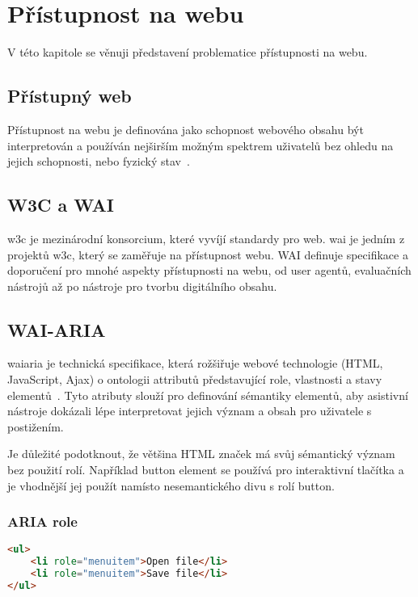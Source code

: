 \chapter{Přístupnost na webu}

V této kapitole se věnuji představení problematice přístupnosti na webu.

\section{Přístupný web}

Přístupnost na webu je definována jako schopnost webového obsahu být interpretován a používán nejširším možným spektrem uživatelů bez ohledu na jejich schopnosti, nebo fyzický stav~\cite{w3-accessibility}.

\section{W3C a WAI}


\gls{w3c} je mezinárodní konsorcium, které vyvíjí standardy pro web.
\gls{wai} je jedním z projektů \gls{w3c}, který se zaměřuje na přístupnost webu.
WAI definuje specifikace a doporučení pro mnohé aspekty přístupnosti na webu, od user agentů, evaluačních nástrojů až po nástroje pro tvorbu digitálního obsahu.

\section{WAI-ARIA}

\gls{waiaria} je technická specifikace, která rožšiřuje webové technologie (HTML, JavaScript, Ajax) o ontologii attributů představující role, vlastnosti a stavy elementů~\cite{wai-aria}.
Tyto atributy slouží pro definování sémantiky elementů, aby asistivní nástroje dokázali lépe interpretovat jejich význam a obsah pro uživatele s postižením.

Je důležité podotknout, že většina HTML značek má svůj sémantický význam bez použití rolí.
Například button element se používá pro interaktivní tlačítka a je vhodnější jej použít namísto nesemantického divu s rolí button.

\subsection{ARIA role}

\begin{lstlisting}[caption={Ukázka aria rolí}, label={lst:example}, language=html, float=htb]
<ul>
    <li role="menuitem">Open file</li>
    <li role="menuitem">Save file</li>
</ul>
\end{lstlisting}

